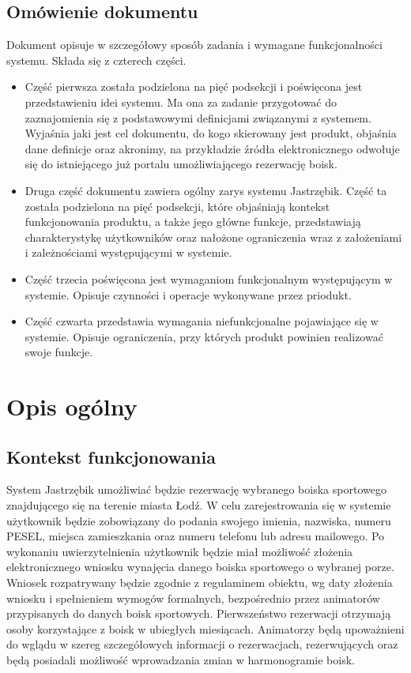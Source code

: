 \documentclass[a4paper, portrait,11pt]{article}
\begin{document}
\subsection {Omówienie dokumentu}
Dokument opisuje w szczegółowy sposób zadania i wymagane funkcjonalności systemu. Składa się z czterech części.
\begin{itemize}
	\item Część pierwsza  została podzielona na pięć podsekcji i poświęcona jest przedstawieniu idei systemu. Ma ona za zadanie przygotować do zaznajomienia się z podstawowymi definicjami związanymi z systemem. Wyjaśnia jaki jest cel dokumentu, do kogo skierowany jest produkt, objaśnia dane definicje oraz akronimy, na przykładzie źródła elektronicznego odwołuje się do istniejącego już portalu umożliwiającego rezerwację boisk. 
	\item Druga część dokumentu zawiera ogólny zarys systemu Jastrzębik. Część ta została podzielona na pięć podsekcji, które objaśniają kontekst funkcjonowania produktu, a także jego główne funkcje, przedstawiają charakterystykę użytkowników oraz nałożone ograniczenia wraz z założeniami i zależnościami występującymi w systemie.
	\item Część trzecia poświęcona jest wymaganiom funkcjonalnym występującym w systemie. Opisuje czynności i operacje wykonywane przez priodukt.
	\item Część czwarta przedstawia wymagania niefunkcjonalne pojawiające się w systemie. Opisuje ograniczenia, przy których produkt powinien realizować swoje funkcje.
\end{itemize}

\section {Opis ogólny}

\subsection {Kontekst funkcjonowania}
System Jastrzębik umożliwiać będzie rezerwację wybranego boiska sportowego znajdującego się na terenie miasta Łodź. W celu zarejestrowania się w systemie użytkownik będzie zobowiązany do podania swojego imienia, nazwiska, numeru PESEL, miejsca zamieszkania oraz numeru telefonu lub adresu mailowego. Po wykonaniu uwierzytelnienia użytkownik będzie miał możliwość złożenia elektronicznego wniosku wynajęcia danego boiska sportowego o wybranej porze. Wniosek rozpatrywany będzie zgodnie z regulaminem obiektu, wg daty złożenia wniosku i spełnieniem wymogów formalnych, bezpośrednio przez animatorów przypisanych do danych boisk sportowych. Pierwszeństwo rezerwacji otrzymają osoby korzystające z boisk w ubiegłych miesiącach. Animatorzy będą upoważnieni do wglądu w szereg szczegółowych informacji o rezerwacjach, rezerwujących oraz będą posiadali możliwość wprowadzania zmian w harmonogramie boisk. 
\end{document}
